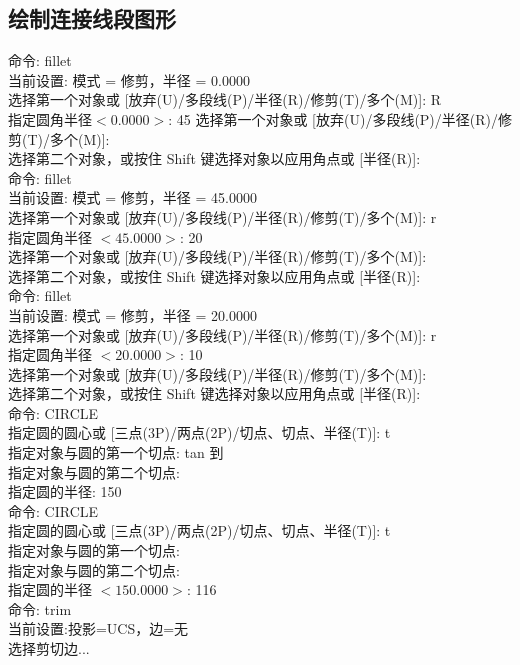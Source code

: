 \indent
\subsection{绘制连接线段图形}
\noindent
命令: fillet\\
当前设置: 模式 = 修剪，半径 = 0.0000\\
选择第一个对象或 [放弃(U)/多段线(P)/半径(R)/修剪(T)/多个(M)]: R \\
指定圆角半径$ <0.0000>$: 45
选择第一个对象或 [放弃(U)/多段线(P)/半径(R)/修剪(T)/多个(M)]:\\
选择第二个对象，或按住 Shift 键选择对象以应用角点或 [半径(R)]:\\
命令: fillet\\
当前设置: 模式 = 修剪，半径 = 45.0000\\
选择第一个对象或 [放弃(U)/多段线(P)/半径(R)/修剪(T)/多个(M)]: r\\
 指定圆角半径 $<45.0000>$: 20\\
选择第一个对象或 [放弃(U)/多段线(P)/半径(R)/修剪(T)/多个(M)]:\\
选择第二个对象，或按住 Shift 键选择对象以应用角点或 [半径(R)]:\\
命令: fillet\\
当前设置: 模式 = 修剪，半径 = 20.0000\\
选择第一个对象或 [放弃(U)/多段线(P)/半径(R)/修剪(T)/多个(M)]: r\\
指定圆角半径 $<20.0000>$: 10\\
选择第一个对象或 [放弃(U)/多段线(P)/半径(R)/修剪(T)/多个(M)]:\\
选择第二个对象，或按住 Shift 键选择对象以应用角点或 [半径(R)]:\\
命令: CIRCLE \\
指定圆的圆心或 [三点(3P)/两点(2P)/切点、切点、半径(T)]: t\\
指定对象与圆的第一个切点: tan 到\\
指定对象与圆的第二个切点:\\
指定圆的半径: 150\\
命令: CIRCLE \\
指定圆的圆心或 [三点(3P)/两点(2P)/切点、切点、半径(T)]: t\\
指定对象与圆的第一个切点:\\
指定对象与圆的第二个切点:\\
指定圆的半径 $<150.0000>$: 116\\
命令: trim\\
当前设置:投影=UCS，边=无\\
选择剪切边...\\
